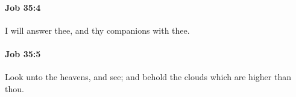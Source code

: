 		\paragraph{Job 35:4} %
			\label{JOB-35-4}

			I will answer thee, and thy companions with thee.


		\paragraph{Job 35:5} %
			\label{JOB-35-5}

			Look unto the heavens, and see; and behold the clouds which are higher than thou.


